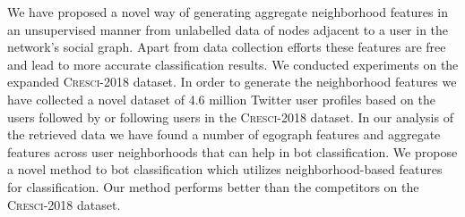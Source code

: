 \noindent We have proposed a novel way of generating aggregate neighborhood features in an unsupervised manner from unlabelled data of nodes adjacent to a user in the network's social graph. Apart from data collection efforts these features are free and lead to more accurate classification results. We conducted experiments on the expanded \textsc{Cresci-2018} dataset. In order to generate the neighborhood features we have collected a novel dataset of 4.6 million Twitter user profiles based on the users followed by or following users in the \textsc{Cresci-2018} dataset. In our analysis of the retrieved data we have found a number of egograph features and aggregate features across user neighborhoods that can help in bot classification. We propose a novel method to bot classification which utilizes neighborhood-based features for classification. Our method performs better than the competitors on the \textsc{Cresci-2018} dataset.